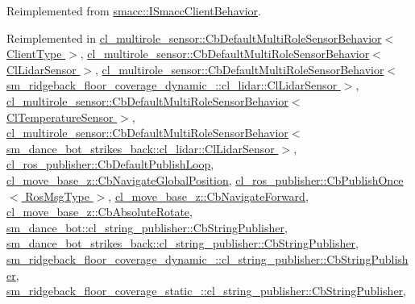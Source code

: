 Reimplemented from \hyperlink{classsmacc_1_1ISmaccClientBehavior_a36bf771905e3bf750909a15e4215a9b3}{smacc\+::\+I\+Smacc\+Client\+Behavior}.



Reimplemented in \hyperlink{classcl__multirole__sensor_1_1CbDefaultMultiRoleSensorBehavior_a0f400c7e29d0cb1dda11242a5a922f4c}{cl\+\_\+multirole\+\_\+sensor\+::\+Cb\+Default\+Multi\+Role\+Sensor\+Behavior$<$ Client\+Type $>$}, \hyperlink{classcl__multirole__sensor_1_1CbDefaultMultiRoleSensorBehavior_a0f400c7e29d0cb1dda11242a5a922f4c}{cl\+\_\+multirole\+\_\+sensor\+::\+Cb\+Default\+Multi\+Role\+Sensor\+Behavior$<$ Cl\+Lidar\+Sensor $>$}, \hyperlink{classcl__multirole__sensor_1_1CbDefaultMultiRoleSensorBehavior_a0f400c7e29d0cb1dda11242a5a922f4c}{cl\+\_\+multirole\+\_\+sensor\+::\+Cb\+Default\+Multi\+Role\+Sensor\+Behavior$<$ sm\+\_\+ridgeback\+\_\+floor\+\_\+coverage\+\_\+dynamic\+\_\+::cl\+\_\+lidar\+::\+Cl\+Lidar\+Sensor $>$}, \hyperlink{classcl__multirole__sensor_1_1CbDefaultMultiRoleSensorBehavior_a0f400c7e29d0cb1dda11242a5a922f4c}{cl\+\_\+multirole\+\_\+sensor\+::\+Cb\+Default\+Multi\+Role\+Sensor\+Behavior$<$ Cl\+Temperature\+Sensor $>$}, \hyperlink{classcl__multirole__sensor_1_1CbDefaultMultiRoleSensorBehavior_a0f400c7e29d0cb1dda11242a5a922f4c}{cl\+\_\+multirole\+\_\+sensor\+::\+Cb\+Default\+Multi\+Role\+Sensor\+Behavior$<$ sm\+\_\+dance\+\_\+bot\+\_\+strikes\+\_\+back\+::cl\+\_\+lidar\+::\+Cl\+Lidar\+Sensor $>$}, \hyperlink{classcl__ros__publisher_1_1CbDefaultPublishLoop_a206c6bc09e7c6414304b679ec415c19f}{cl\+\_\+ros\+\_\+publisher\+::\+Cb\+Default\+Publish\+Loop}, \hyperlink{classcl__move__base__z_1_1CbNavigateGlobalPosition_a5c18268af1e7fc236aa155a58345d5d7}{cl\+\_\+move\+\_\+base\+\_\+z\+::\+Cb\+Navigate\+Global\+Position}, \hyperlink{classcl__ros__publisher_1_1CbPublishOnce_ad82cb7d6ac69fe9b91bc955550ab92cb}{cl\+\_\+ros\+\_\+publisher\+::\+Cb\+Publish\+Once$<$ Ros\+Msg\+Type $>$}, \hyperlink{classcl__move__base__z_1_1CbNavigateForward_a2160484562ef5fb1c655fab7f990241e}{cl\+\_\+move\+\_\+base\+\_\+z\+::\+Cb\+Navigate\+Forward}, \hyperlink{classcl__move__base__z_1_1CbAbsoluteRotate_a0e362b8e9f0d7de5aeee183ba4031437}{cl\+\_\+move\+\_\+base\+\_\+z\+::\+Cb\+Absolute\+Rotate}, \hyperlink{classsm__dance__bot_1_1cl__string__publisher_1_1CbStringPublisher_ac93cc1eb150140331cb3e560ec8249e2}{sm\+\_\+dance\+\_\+bot\+::cl\+\_\+string\+\_\+publisher\+::\+Cb\+String\+Publisher}, \hyperlink{classsm__dance__bot__strikes__back_1_1cl__string__publisher_1_1CbStringPublisher_ae4aa02553119822c583bb2abb44c810c}{sm\+\_\+dance\+\_\+bot\+\_\+strikes\+\_\+back\+::cl\+\_\+string\+\_\+publisher\+::\+Cb\+String\+Publisher}, \hyperlink{classsm__ridgeback__floor__coverage__dynamic__1_1_1cl__string__publisher_1_1CbStringPublisher_a78e82d742a2cb9530eab92e030088beb}{sm\+\_\+ridgeback\+\_\+floor\+\_\+coverage\+\_\+dynamic\+\_\+::cl\+\_\+string\+\_\+publisher\+::\+Cb\+String\+Publisher}, \hyperlink{classsm__ridgeback__floor__coverage__static__1_1_1cl__string__publisher_1_1CbStringPublisher_a2a055b3dfef9cfa7fc2433f92441ff0e}{sm\+\_\+ridgeback\+\_\+floor\+\_\+coverage\+\_\+static\+\_\+::cl\+\_\+string\+\_\+publisher\+::\+Cb\+String\+Publisher}, 